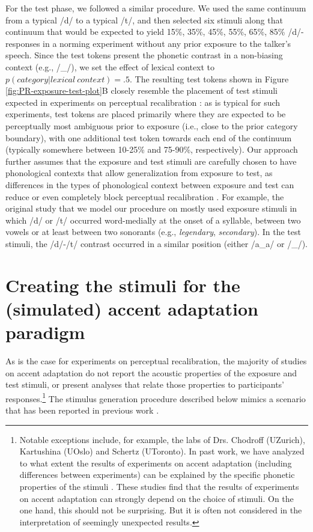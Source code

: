 \documentclass[
  11pt,
  man,floatsintext]{apa6}
\begin{document}
For the test phase, we followed a similar procedure. We used the same continuum from a typical /d/ to a typical /t/, and then selected six stimuli along that continuum that would be expected to yield 15\%, 35\%, 45\%, 55\%, 65\%, 85\% /d/-responses in a norming experiment without any prior exposure to the talker's speech. Since the test tokens present the phonetic contrast in a non-biasing context (e.g., /\_/), we set the effect of lexical context to \(p(category | lexical\ context) = .5\). The resulting test tokens shown in Figure \ref{fig:PR-exposure-test-plot}B closely resemble the placement of test stimuli expected in experiments on perceptual recalibration \autocites[e.g.,][]{norris2003,kraljic-samuel2005,kraljic-samuel2006}: as is typical for such experiments, test tokens are placed primarily where they are expected to be perceptually most ambiguous prior to exposure (i.e., close to the prior category boundary), with one additional test token towards each end of the continuum (typically somewhere between 10-25\% and 75-90\%, respectively). Our approach further assumes that the exposure and test stimuli are carefully chosen to have phonological contexts that allow generalization from exposure to test, as differences in the types of phonological context between exposure and test can reduce or even completely block perceptual recalibration \autocite{eisner2013,mitterer2013}. For example, the original study that we model our procedure on mostly used exposure stimuli in which /d/ or /t/ occurred word-medially at the onset of a syllable, between two vowels \autocite[e.g., \emph{crocodile}, \emph{academic}, etc., see Table 1 in][]{kraljic-samuel2006} or at least between two sonorants (e.g., \emph{legendary}, \emph{secondary}). In the test stimuli, the /d/-/t/ contrast occurred in a similar position (either /a\_a/ or /\_/).

\section{Creating the stimuli for the (simulated) accent adaptation paradigm}\label{sec:SI-AA}

As is the case for experiments on perceptual recalibration, the majority of studies on accent adaptation do not report the acoustic properties of the exposure and test stimuli, or present analyses that relate those properties to participants' responses.\footnote{Notable exceptions include, for example, the labs of Drs. Chodroff (UZurich), Kartushina (UOslo) and Schertz (UToronto). In past work, we have analyzed to what extent the results of experiments on accent adaptation (including differences between experiments) can be explained by the specific phonetic properties of the stimuli \autocites[e.g.,][]{tan2021,xie2017,xie2021jep}. These studies find that the results of experiments on accent adaptation can strongly depend on the choice of stimuli. On the one hand, this should not be surprising. But it is often not considered in the interpretation of seemingly unexpected results.} The stimulus generation procedure described below mimics a scenario that has been reported in previous work \autocite[e.g.,][]{schertz2015}.
\end{document}
